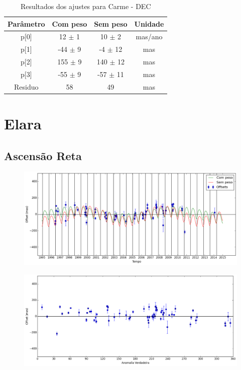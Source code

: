 \documentclass[11pt,a4paper]{report}
\begin{document}
\begin{table}[h!]
\caption{\label{Tab: Carme-DEC} Resultados dos ajustes para Carme - DEC}
\begin{centering}
\begin{tabular}{cccc}
\hline
\hline
Parâmetro & Com peso & Sem peso & Unidade\tabularnewline
\hline
p[0] & 12 $\pm$ 1 & 10 $\pm$ 2 & mas/ano\\
p[1] & -44 $\pm$ 9 & -4 $\pm$ 12 & mas\\
p[2] & 155 $\pm$ 9 & 140 $\pm$ 12 & mas\\
p[3] & -55 $\pm$ 9 & -57 $\pm$ 11 & mas\\
Residuo & 58 & 49 & mas\\
\hline 
\end{tabular} 
\par\end{centering}
\end{table}

\chapter*{Elara}
\section*{Ascensão Reta}

\begin{figure}[h]
\includegraphics[scale=0.45]{Elara/RA.png} 
\end{figure}

\begin{figure}[h]
\includegraphics[scale=0.45]{Elara/RA_anom.png}  
\end{figure}
\end{document}
